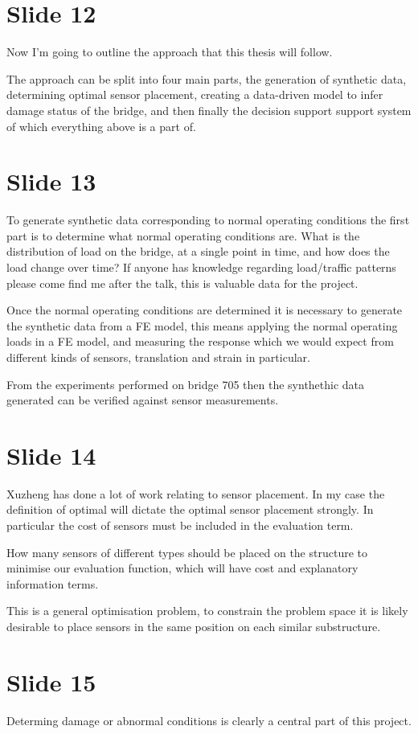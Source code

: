 \documentclass[11pt]{article}
\begin{document}
\section{Slide 12}
\label{sec:orgc634878}
Now I'm going to outline the approach that this thesis will follow.

The approach can be split into four main parts, the generation of synthetic
data, determining optimal sensor placement, creating a data-driven model to
infer damage status of the bridge, and then finally the decision support
support system of which everything above is a part of.
\section{Slide 13}
\label{sec:orgf22c2e2}
To generate synthetic data corresponding to normal operating conditions the
first part is to determine what normal operating conditions are. What is the
distribution of load on the bridge, at a single point in time, and how does
the load change over time? If anyone has knowledge regarding load/traffic
patterns please come find me after the talk, this is valuable data for the
project.

Once the normal operating conditions are determined it is necessary to
generate the synthetic data from a FE model, this means applying the normal
operating loads in a FE model, and measuring the response which we would
expect from different kinds of sensors, translation and strain in particular.

From the experiments performed on bridge 705 then the synthethic data
generated can be verified against sensor measurements.
\section{Slide 14}
\label{sec:orga4d0b45}
Xuzheng has done a lot of work relating to sensor placement. In my case the
definition of optimal will dictate the optimal sensor placement strongly. In
particular the cost of sensors must be included in the evaluation term.

How many sensors of different types should be placed on the structure to
minimise our evaluation function, which will have cost and explanatory
information terms.

This is a general optimisation problem, to constrain the problem space it is
likely desirable to place sensors in the same position on each similar
substructure.
\section{Slide 15}
\label{sec:org2dd9a05}
Determing damage or abnormal conditions is clearly a central part of this
project.
\end{document}
